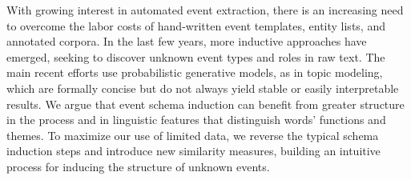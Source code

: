 With growing interest in automated event extraction, there is an increasing need to overcome the labor costs of hand-written event templates, entity lists, and annotated corpora. In the last few years, more inductive approaches have emerged, seeking to discover unknown event types and roles in raw text. The main recent efforts use probabilistic generative models, as in topic modeling, which are formally concise but do not always yield stable or easily interpretable results. We argue that event schema induction can benefit from greater structure in the process and in linguistic features that distinguish words' functions and themes. To maximize our use of limited data, we reverse the typical schema induction steps and introduce new similarity measures, building an intuitive process for inducing the structure of unknown events.
